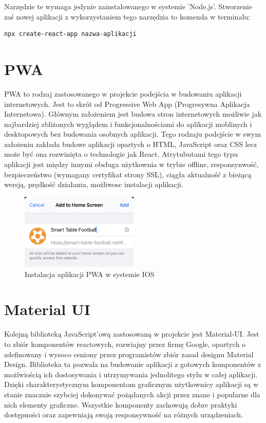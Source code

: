 Narzędzie te wymaga jedynie zainstalowanego w systemie 'Node.js'. Stworzenie zaś nowej aplikacji z wykorzystaniem tego narzędzia to komenda w terminalu:

\begin{lstlisting}[breaklines=true]
    npx create-react-app nazwa-aplikacji
\end{lstlisting}


\section{PWA}
PWA to rodzaj zastosowanego w projekcie podejścia w budowaniu aplikacji internetowych. Jest to skrót od Progressive Web App (Progresywna Aplikacja Internetowa). Głównym założeniem jest budowa stron internetowych możliwie jak najbardziej zbliżonych wyglądem i funkcjonalnościami do aplikacji moblinych i desktopowych bez budowania osobnych aplikacji. Tego rodzaju podejście w swym założeniu zakłada budowe aplikacji opartych o HTML, JavaScript oraz CSS lecz może być ona rozwinięta o technologie jak React. Atrytubutami tego typu aplikacji jest między innymi obsługa użytkownia w trybie offline, responsynwość, bezpieczeństwo (wymagany certyfikat strony SSL), ciągła aktualność z bieżącą wersją, prędkość działania, możliwosc instalacji aplikacji.

\begin{figure}[h!]
    \centering
    \includegraphics[width=0.5\textwidth]{images/player/PWA_install.jpg}
    \caption{Instalacja aplikacji PWA w systemie IOS}
    \label{fig:mobile}
\end{figure}

\section{Material UI}
Kolejną biblioteką JavaScript'ową zastosowaną w projekcie jest Material-UI. Jest to zbiór komponentów reactowych, rozwiajny przez firmę Google, opartych o zdefinowany i wysoco ceniony przez programistów zbiór zasad designu Material Design. Biblioteka ta pozwala na budowanie aplikacji z gotowych komponentów z możlwiością ich dostosywania i utrzymywania jednolitego stylu w całej aplikacji. Dzięki charakterystycznym komponentom graficznym użytkownicy aplikacji są w stanie znacznie szybciej dokonywać pożądanych akcji przez znane i popularne dla nich elementy graficzne. Wszystkie komponenty zachowują dobre praktyki dostępności oraz zapewniają swoją responsywność na różnych urządzeniach.

